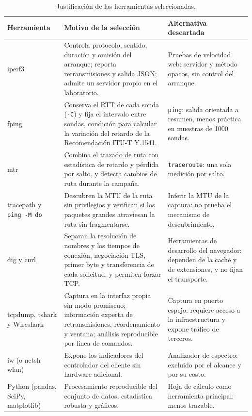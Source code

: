 \begin{table}[htbp]
  \centering
  \caption{Justificación de las herramientas seleccionadas.}
  \label{tab:justificacion}
  \footnotesize
  \renewcommand{\arraystretch}{1.25}
  \begin{tabularx}{\textwidth}{|p{2.2cm}|>{\raggedright\arraybackslash}X|>{\raggedright\arraybackslash}p{4.0cm}|}
    \hline
    \textbf{Herramienta} & \textbf{Motivo de la selección} & \textbf{Alternativa descartada} \\
    \hline
    iperf3 & Controla protocolo, sentido, duración y omisión del arranque; reporta retransmisiones y salida JSON; admite un servidor propio en el laboratorio. & Pruebas de velocidad web: servidor y método opacos, sin control del arranque. \\
    \hline
    fping & Conserva el RTT de cada sonda (\texttt{-C}) y fija el intervalo entre sondas, condición para calcular la variación del retardo de la Recomendación ITU-T Y.1541. & \texttt{ping}: salida orientada a resumen, menos práctica en muestras de 1000 sondas. \\
    \hline
    mtr & Combina el trazado de ruta con estadística de retardo y pérdida por salto, y detecta cambios de ruta durante la campaña. & \texttt{traceroute}: una sola medición por salto. \\
    \hline
    tracepath y \texttt{ping -M do} & Descubren la MTU de la ruta sin privilegios y verifican si los paquetes grandes atraviesan la ruta sin fragmentarse. & Inferir la MTU de la captura: no prueba el mecanismo de descubrimiento. \\
    \hline
    dig y curl & Separan la resolución de nombres y los tiempos de conexión, negociación TLS, primer byte y transferencia de cada solicitud, y permiten forzar TCP. & Herramientas de desarrollo del navegador: dependen de la caché y de extensiones, y no fijan el transporte. \\
    \hline
    tcpdump, tshark y Wireshark & Captura en la interfaz propia sin modo promiscuo; información experta de retransmisiones, reordenamiento y ventana; análisis reproducible por línea de comandos. & Captura en puerto espejo: requiere acceso a la infraestructura y expone tráfico de terceros. \\
    \hline
    iw (o netsh wlan) & Expone los indicadores del controlador del cliente sin hardware adicional. & Analizador de espectro: excluido por el alcance y por su costo. \\
    \hline
    Python (pandas, SciPy, matplotlib) & Procesamiento reproducible del conjunto de datos, estadística robusta y gráficos. & Hoja de cálculo como herramienta principal: menos trazable. \\
    \hline
  \end{tabularx}
  \vspace{2pt}
  \raggedright
\end{table}

